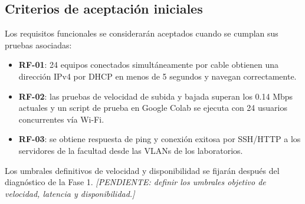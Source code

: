 \subsection{Criterios de aceptación iniciales}

	Los requisitos funcionales se considerarán aceptados cuando se cumplan sus pruebas asociadas:

	\begin{itemize}
		\item \textbf{RF-01}: 24 equipos conectados simultáneamente por cable obtienen una dirección IPv4 por DHCP en menos de 5 segundos y navegan correctamente.
		\item \textbf{RF-02}: las pruebas de velocidad de subida y bajada superan los 0.14 Mbps actuales y un script de prueba en Google Colab se ejecuta con 24 usuarios concurrentes vía Wi-Fi.
		\item \textbf{RF-03}: se obtiene respuesta de ping y conexión exitosa por SSH/HTTP a los servidores de la facultad desde las VLANs de los laboratorios.
	\end{itemize}

	Los umbrales definitivos de velocidad y disponibilidad se fijarán después del diagnóstico de la Fase 1. \textit{[PENDIENTE: definir los umbrales objetivo de velocidad, latencia y disponibilidad.]}
